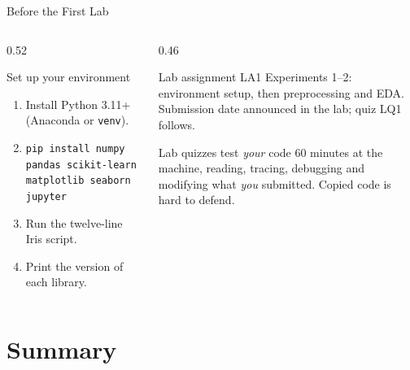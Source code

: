 \documentclass[aspectratio=169]{beamer}
\begin{document}
\begin{frame}[shrink=6]{Before the First Lab}
  \begin{columns}[T]
    \begin{column}{0.52\textwidth}
      \begin{block}{Set up your environment}
        \footnotesize
        \begin{enumerate}
          \item Install Python 3.11+ (Anaconda or \texttt{venv}).
          \item \texttt{pip install numpy pandas scikit-learn matplotlib seaborn jupyter}
          \item Run the twelve-line Iris script.
          \item Print the version of each library.
        \end{enumerate}
      \end{block}
    \end{column}
    \begin{column}{0.46\textwidth}
      \begin{block}{Lab assignment LA1}
        \footnotesize Experiments 1--2: environment setup, then preprocessing
        and EDA. Submission date announced in the lab; quiz LQ1 follows.
      \end{block}
      \begin{alertblock}{Lab quizzes test \emph{your} code}
        \footnotesize 60 minutes at the machine, reading, tracing, debugging and
        modifying what \emph{you} submitted. Copied code is hard to defend.
      \end{alertblock}
    \end{column}
  \end{columns}
\end{frame}

\section{Summary}
\label{sec:summary}
\end{document}
